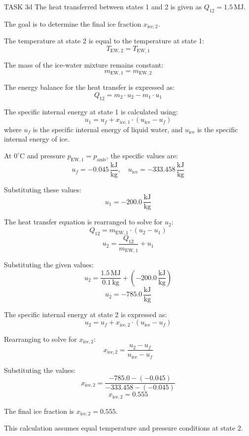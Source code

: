 TASK 3d  
The heat transferred between states 1 and 2 is given as \( Q_{12} = 1.5 \, \text{MJ} \).  

The goal is to determine the final ice fraction \( x_{\text{ice},2} \).  

The temperature at state 2 is equal to the temperature at state 1:  
\[
T_{\text{EW},2} = T_{\text{EW},1}
\]  

The mass of the ice-water mixture remains constant:  
\[
m_{\text{EW},1} = m_{\text{EW},2}
\]  

The energy balance for the heat transfer is expressed as:  
\[
Q_{12} = m_2 \cdot u_2 - m_1 \cdot u_1
\]  

The specific internal energy at state 1 is calculated using:  
\[
u_1 = u_f + x_{\text{ice},1} \cdot (u_{\text{ice}} - u_f)
\]  
where \( u_f \) is the specific internal energy of liquid water, and \( u_{\text{ice}} \) is the specific internal energy of ice.  

At \( 0^\circ\text{C} \) and pressure \( p_{\text{EW},1} = p_{\text{amb}} \), the specific values are:  
\[
u_f = -0.045 \, \frac{\text{kJ}}{\text{kg}}, \quad u_{\text{ice}} = -333.458 \, \frac{\text{kJ}}{\text{kg}}
\]  

Substituting these values:  
\[
u_1 = -200.0 \, \frac{\text{kJ}}{\text{kg}}
\]  

The heat transfer equation is rearranged to solve for \( u_2 \):  
\[
Q_{12} = m_{\text{EW},1} \cdot (u_2 - u_1)
\]  
\[
u_2 = \frac{Q_{12}}{m_{\text{EW},1}} + u_1
\]  

Substituting the given values:  
\[
u_2 = \frac{1.5 \, \text{MJ}}{0.1 \, \text{kg}} + (-200.0 \, \frac{\text{kJ}}{\text{kg}})
\]  
\[
u_2 = -785.0 \, \frac{\text{kJ}}{\text{kg}}
\]  

The specific internal energy at state 2 is expressed as:  
\[
u_2 = u_f + x_{\text{ice},2} \cdot (u_{\text{ice}} - u_f)
\]  

Rearranging to solve for \( x_{\text{ice},2} \):  
\[
x_{\text{ice},2} = \frac{u_2 - u_f}{u_{\text{ice}} - u_f}
\]  

Substituting the values:  
\[
x_{\text{ice},2} = \frac{-785.0 - (-0.045)}{-333.458 - (-0.045)}
\]  
\[
x_{\text{ice},2} = 0.555
\]  

The final ice fraction is \( x_{\text{ice},2} = 0.555 \).  

This calculation assumes equal temperature and pressure conditions at state 2.
